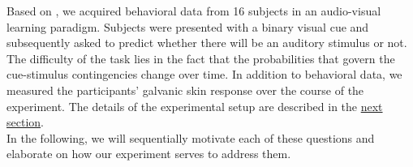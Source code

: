\documentclass{article}
\begin{document}
\begin{multicols}{2}
\begin{enumerate}[A.]
\end{enumerate}
Based on \cite{iglesias2013hierarchical}, we acquired behavioral data from 16 subjects in an audio-visual learning paradigm. Subjects were presented with a binary visual cue and subsequently asked to predict whether there will be an auditory stimulus or not. The difficulty of the task lies in the fact that the probabilities that govern the cue-stimulus contingencies change over time. In addition to behavioral data, we measured the participants' galvanic skin response over the course of the experiment. The details of the experimental setup are described in the \hyperref[sec:meth]{next section}.
\\ In the following, we will sequentially motivate each of these questions and elaborate on how our experiment serves to address them. \\
\vspace{1mm}


\end{multicols}
\end{document}
